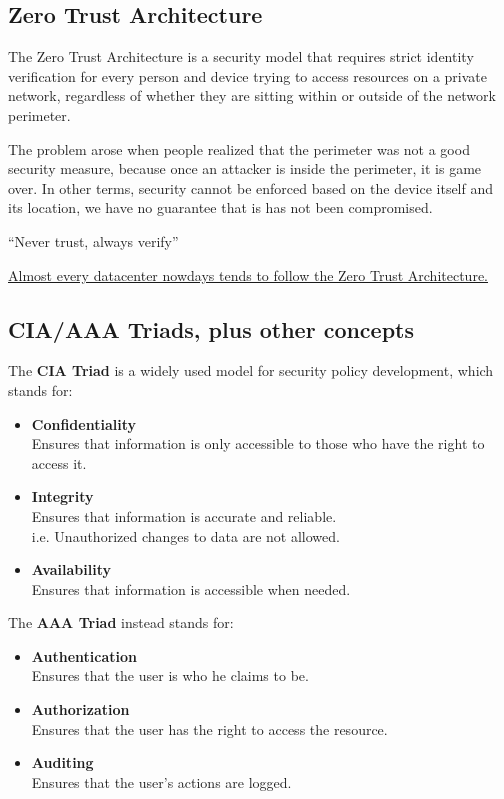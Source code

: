 \subsection{Zero Trust Architecture}
The Zero Trust Architecture is a security model that requires strict identity verification for every person and device trying to access resources on a private network, regardless of whether they are sitting within or outside of the network perimeter.

The problem arose when people realized that the perimeter was not a good security measure, because once an attacker is inside the perimeter, it is game over. In other terms, security cannot be enforced based on the device itself and its location, we have no guarantee that is has not been compromised.

\begin{definition}
   ``Never trust, always verify''
\end{definition}

\ul{Almost every datacenter nowdays tends to follow the Zero Trust Architecture.}

\subsection{CIA/AAA Triads, plus other concepts}
The \textbf{CIA Triad} is a widely used model for security policy development, which stands for:
\begin{itemize}
   \item \textbf{Confidentiality}\\
   Ensures that information is only accessible to those who have the right to access it.
   \item \textbf{Integrity}\\
   Ensures that information is accurate and reliable.\\
   i.e. Unauthorized changes to data are not allowed.
   \item \textbf{Availability}\\
   Ensures that information is accessible when needed.
\end{itemize}

The \textbf{AAA Triad} instead stands for:
\begin{itemize}
   \item \textbf{Authentication}\\
   Ensures that the user is who he claims to be.
   \item \textbf{Authorization}\\
   Ensures that the user has the right to access the resource.
   \item \textbf{Auditing}\\
   Ensures that the user's actions are logged.
\end{itemize}

